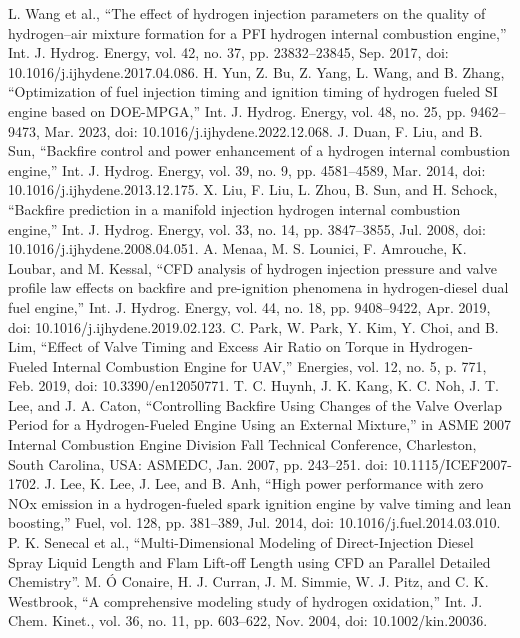 \documentclass[conference]{IEEEtran}
\begin{document}
\begin{thebibliography}{00}
 L. Wang et al., “The effect of hydrogen injection parameters on the quality of hydrogen–air mixture formation for a PFI hydrogen internal combustion engine,” Int. J. Hydrog. Energy, vol. 42, no. 37, pp. 23832–23845, Sep. 2017, doi: 10.1016/j.ijhydene.2017.04.086.
 H. Yun, Z. Bu, Z. Yang, L. Wang, and B. Zhang, “Optimization of fuel injection timing and ignition timing of hydrogen fueled SI engine based on DOE-MPGA,” Int. J. Hydrog. Energy, vol. 48, no. 25, pp. 9462–9473, Mar. 2023, doi: 10.1016/j.ijhydene.2022.12.068.
 J. Duan, F. Liu, and B. Sun, “Backfire control and power enhancement of a hydrogen internal combustion engine,” Int. J. Hydrog. Energy, vol. 39, no. 9, pp. 4581–4589, Mar. 2014, doi: 10.1016/j.ijhydene.2013.12.175.
 X. Liu, F. Liu, L. Zhou, B. Sun, and H. Schock, “Backfire prediction in a manifold injection hydrogen internal combustion engine,” Int. J. Hydrog. Energy, vol. 33, no. 14, pp. 3847–3855, Jul. 2008, doi: 10.1016/j.ijhydene.2008.04.051.
 A. Menaa, M. S. Lounici, F. Amrouche, K. Loubar, and M. Kessal, “CFD analysis of hydrogen injection pressure and valve profile law effects on backfire and pre-ignition phenomena in hydrogen-diesel dual fuel engine,” Int. J. Hydrog. Energy, vol. 44, no. 18, pp. 9408–9422, Apr. 2019, doi: 10.1016/j.ijhydene.2019.02.123.
 C. Park, W. Park, Y. Kim, Y. Choi, and B. Lim, “Effect of Valve Timing and Excess Air Ratio on Torque in Hydrogen-Fueled Internal Combustion Engine for UAV,” Energies, vol. 12, no. 5, p. 771, Feb. 2019, doi: 10.3390/en12050771.
 T. C. Huynh, J. K. Kang, K. C. Noh, J. T. Lee, and J. A. Caton, “Controlling Backfire Using Changes of the Valve Overlap Period for a Hydrogen-Fueled Engine Using an External Mixture,” in ASME 2007 Internal Combustion Engine Division Fall Technical Conference, Charleston, South Carolina, USA: ASMEDC, Jan. 2007, pp. 243–251. doi: 10.1115/ICEF2007-1702.
 J. Lee, K. Lee, J. Lee, and B. Anh, “High power performance with zero NOx emission in a hydrogen-fueled spark ignition engine by valve timing and lean boosting,” Fuel, vol. 128, pp. 381–389, Jul. 2014, doi: 10.1016/j.fuel.2014.03.010.
 P. K. Senecal et al., “Multi-Dimensional Modeling of Direct-Injection Diesel Spray Liquid Length and Flam Lift-off Length using CFD an Parallel Detailed Chemistry”.
 M. Ó Conaire, H. J. Curran, J. M. Simmie, W. J. Pitz, and C. K. Westbrook, “A comprehensive modeling study of hydrogen oxidation,” Int. J. Chem. Kinet., vol. 36, no. 11, pp. 603–622, Nov. 2004, doi: 10.1002/kin.20036.

\end{thebibliography}
\end{document}
